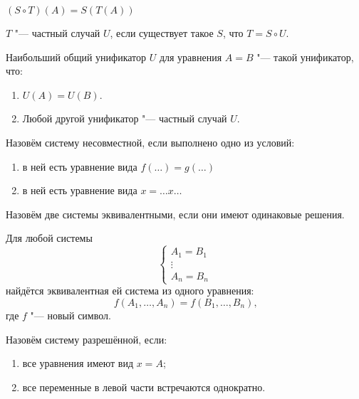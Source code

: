 \begin{definition}[Композиция]
    $(S \circ T)(A) = S(T(A))$
\end{definition}

\begin{definition}
    $T$ "--- частный случай $U$, если существует такое $S$, что $T = S \circ U$.
\end{definition}

\begin{definition}
    Наибольший общий унификатор $U$ для уравнения $A=B$ "--- такой унификатор, что:
    \begin{enumerate}
        \item $U(A)=U(B)$.
        \item Любой другой унификатор "--- частный случай $U$.
    \end{enumerate}
\end{definition}

\begin{definition}
    Назовём систему несовместной, если выполнено одно из условий:
    \begin{enumerate}
        \item в ней есть уравнение вида $f(\ldots)=g(\ldots)$
        \item в ней есть уравнение вида $x = \ldots x \ldots$
    \end{enumerate}
\end{definition}

\begin{definition}
    Назовём две системы эквивалентными, если они имеют одинаковые решения.
\end{definition}

\begin{statement}
    Для любой системы
    \[
        \begin{cases} A_1 = B_1 \\ \vdots \\ A_n = B_n \end{cases}
    \]
    найдётся эквивалентная ей система из одного уравнения:
    \[
        f(A_1, \ldots, A_n) = f(B_1, \ldots, B_n)\text{,}
    \]
    где $f$ "--- новый символ.
\end{statement}

\begin{definition}
    Назовём систему разрешённой, если:
    \begin{enumerate}
        \item все уравнения имеют вид $x = A$;
        \item все переменные в левой части встречаются однократно.
    \end{enumerate}
\end{definition}


